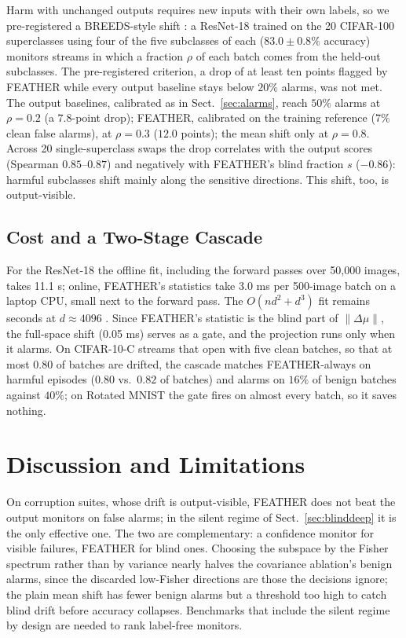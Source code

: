 \documentclass[graybox]{SNmult}
\begin{document}
 Harm with unchanged outputs requires new
inputs with their own labels, so we pre-registered a BREEDS-style shift
\cite{santurkar2021breeds}: a ResNet-18 trained on the 20 CIFAR-100
superclasses using four of the five subclasses of each ($83.0 \pm 0.8\%$
accuracy) monitors streams in which a fraction $\rho$ of each batch comes from
the held-out subclasses. The pre-registered criterion, a drop of at least ten
points flagged by FEATHER while every output baseline stays below $20\%$
alarms, was not met. The output baselines, calibrated as in
Sect.~\ref{sec:alarms}, reach $50\%$ alarms at $\rho = 0.2$ (a $7.8$-point
drop); FEATHER, calibrated on the training reference ($7\%$ clean false
alarms), at $\rho = 0.3$ ($12.0$ points); the mean shift only at $\rho = 0.8$.
Across 20 single-superclass swaps the drop correlates with the output scores
(Spearman $0.85$--$0.87$) and negatively with FEATHER's blind fraction $s$
($-0.86$): harmful subclasses shift mainly along the sensitive directions. This
shift, too, is output-visible.

\subsection{Cost and a Two-Stage Cascade}
\label{sec:cascade}

For the ResNet-18 the offline fit, including the forward passes over
50{,}000 images, takes 11.1 s; online, FEATHER's statistics take 3.0 ms per
500-image batch on a laptop CPU, small next to the forward pass. The
$O(nd^2 + d^3)$ fit remains seconds at $d \approx 4096$
\cite{halko2011structure}. Since FEATHER's statistic is the blind part of
$\lVert\Delta\mu\rVert$, the full-space shift (0.05 ms) serves as a gate, and
the projection runs only when it alarms. On CIFAR-10-C streams that open with five clean batches, so that at
most $0.80$ of batches are drifted, the cascade matches FEATHER-always on harmful episodes ($0.80$
vs.\ $0.82$ of batches) and alarms on $16\%$ of benign batches against $40\%$;
on Rotated MNIST the gate fires on almost every batch, so it saves nothing.

\section{Discussion and Limitations}
\label{sec:limitations}

On corruption suites, whose drift is output-visible, FEATHER does not beat
the output monitors on false alarms; in the silent regime of
Sect.~\ref{sec:blinddeep} it is the only effective one. The two are
complementary: a confidence monitor for visible failures, FEATHER for blind
ones. Choosing the subspace by the Fisher spectrum rather than by variance
nearly halves the covariance ablation's benign alarms,
since the discarded low-Fisher directions are those the decisions ignore; the
plain mean shift has fewer benign alarms but a threshold too high to catch
blind drift before accuracy collapses. Benchmarks
that include the silent regime by design are needed to rank label-free
monitors.
\end{document}
